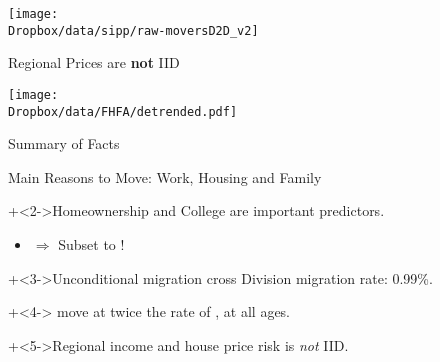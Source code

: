 \documentclass[12pt,english, aspectratio=169]{beamer}
\begin{document}
\begin{frame}[plain]{}

\begin{adjustbox}{center}
\texttt{[image: \\Dropbox/data/sipp/raw-moversD2D\_v2]}
\end{adjustbox}
\end{frame}


\begin{frame}{Regional Prices are \textbf{not} IID}

\begin{adjustbox}{center}
\texttt{[image: \\Dropbox/data/FHFA/detrended.pdf]}\end{adjustbox}

\end{frame}


\begin{frame}{Summary of Facts}


\begin{widee}
\item Main Reasons to Move: Work, Housing and Family
\item \onslide+<2->Homeownership and College are important predictors. 
	\begin{itemize}
	\item $\Rightarrow$ Subset to !
	\end{itemize}
\item \onslide+<3->Unconditional migration cross Division migration rate: 0.99\%.
\item \onslide+<4-> move at twice the rate of , at all ages.
\item \onslide+<5->Regional income and house price risk is \emph{not} IID.
\end{widee}

\end{frame}
\end{document}
